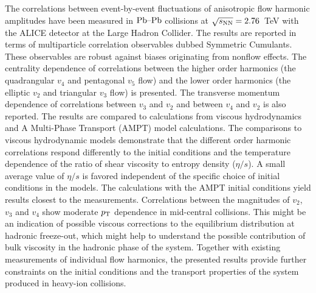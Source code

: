 The correlations between event-by-event fluctuations of anisotropic flow harmonic amplitudes
have been measured in $\textnormal{Pb--Pb}$ collisions at $\sqrt{s_{\textnormal{NN}}}=2.76$~TeV with the ALICE detector at the Large Hadron Collider. 
The results are reported in terms of multiparticle correlation observables dubbed Symmetric Cumulants.
These observables are robust against biases originating from nonflow effects. 
The centrality dependence of correlations between the higher order harmonics (the quadrangular $v_4$ and pentagonal $v_5$ flow) and the lower order harmonics (the elliptic $v_2$ and triangular $v_3$ flow)
is presented. The transverse momentum dependence of correlations between $v_3$ and $v_2$ and between $v_4$ and $v_2$ is also reported. 
The results are compared to calculations from viscous hydrodynamics and  A Multi-Phase Transport ({AMPT}) model calculations.
The comparisons to viscous hydrodynamic models demonstrate that
the different order harmonic correlations respond differently to the initial conditions and the temperature dependence of the ratio of shear viscosity to entropy density ($\eta/s$). 
A small average value of $\eta/s$ is favored independent of the specific choice of initial conditions in the models. The calculations with the AMPT initial conditions yield results closest to the measurements. 
Correlations between the magnitudes of $v_2$, $v_3$ and $v_4$ show moderate $p_{\rm T}$ dependence in mid-central collisions. This might be an indication of possible viscous corrections to the equilibrium distribution at hadronic freeze-out, which might help to understand the possible contribution of bulk viscosity in the hadronic phase of the system.
Together with existing measurements of individual flow harmonics, the presented results provide further constraints 
on the initial conditions and the transport properties of the system produced in heavy-ion collisions.
